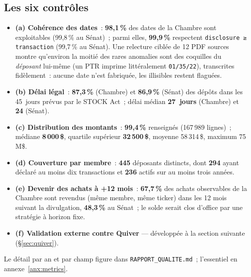 \documentclass[11pt,a4paper]{article}
\newcommand{\co}[1]{\texttt{\small #1}}
\begin{document}
\subsection{Les six contrôles}
\begin{itemize}[nosep,leftmargin=1.5em]
\item \textbf{(a) Cohérence des dates}~: \textbf{98,1\,\%} des dates de la Chambre sont exploitables
(99,8\,\% au Sénat)~; parmi elles, \textbf{99,9\,\%} respectent \co{disclosure ≥ transaction}
(99,7\,\% au Sénat). Une relecture ciblée de 12 PDF sources montre qu'environ la moitié des rares
anomalies sont des coquilles du \emph{déposant} lui-même (un PTR imprime littéralement \co{01/35/22}),
transcrites fidèlement~: aucune date n'est fabriquée, les illisibles restent flaguées.
\item \textbf{(b) Délai légal}~: \textbf{87,3\,\%} (Chambre) et \textbf{86,9\,\%} (Sénat) des dépôts dans
les 45~jours prévus par le STOCK Act~; délai médian \textbf{27~jours} (Chambre) et \textbf{24} (Sénat).
\item \textbf{(c) Distribution des montants}~: \textbf{99,4\,\%} renseignés (167\,989 lignes)~; médiane
\textbf{8\,000\,\$}, quartile supérieur \textbf{32\,500\,\$}, moyenne 58\,314\,\$, maximum 75\,M\$.
\item \textbf{(d) Couverture par membre}~: \textbf{445} déposants distincts, dont \textbf{294} ayant
déclaré au moins dix transactions et \textbf{236} actifs sur au moins trois années.
\item \textbf{(e) Devenir des achats à +12 mois}~: \textbf{67,7\,\%} des achats observables de la Chambre
sont revendus (même membre, même ticker) dans les 12 mois suivant la divulgation, \textbf{48,3\,\%} au
Sénat~; le solde serait clos d'office par une stratégie à horizon fixe.
\item \textbf{(f) Validation externe contre Quiver} — développée à la section suivante
(\S{}\ref{sec:quiver}).
\end{itemize}
Le détail par an et par champ figure dans \co{RAPPORT_QUALITE.md}~; l'essentiel en
annexe~\ref{anx:metrics}.
\end{document}
